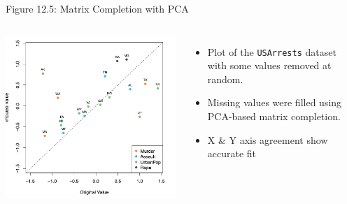 \documentclass[aspectratio=169,xcolor=dvipsnames]{beamer}
\begin{document}
\begin{frame}{Figure 12.5: Matrix Completion with PCA}
  \begin{columns}
    \includegraphics[width=\linewidth]{images/figure12_5.png} %

    \begin{itemize}
      \item Plot of the \texttt{USArrests} dataset with some values removed at random.
      \item Missing values were filled using PCA-based matrix completion.
      \item X \& Y axis agreement show accurate fit
    \end{itemize}
  \end{columns}
\end{frame}
\end{document}
